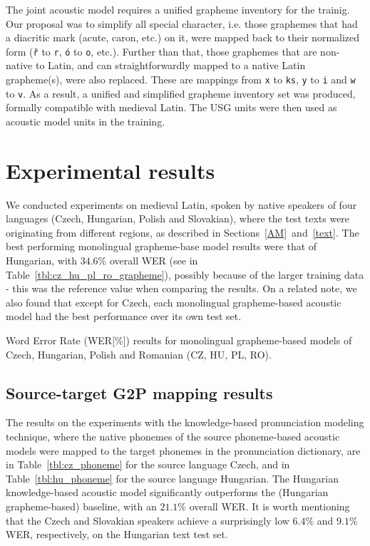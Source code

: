 \documentclass[runningheads,a4paper]{llncs}
\begin{document}
The joint acoustic model requires a unified grapheme inventory for the trainig. Our proposal was to simplify all special character, i.e. those graphemes that had a diacritic mark (acute, caron, etc.) on it, were mapped back to their normalized form (\texttt{\v{r}} to \texttt{r}, \texttt{\'{o}} to \texttt{o}, etc.).
Further than that, those graphemes that are non-native to Latin, and can straightforwardly mapped to a native Latin grapheme(s), were also replaced.
These are mappings from \texttt{x} to \texttt{ks}, \texttt{y} to \texttt{i} and \texttt{w} to \texttt{v}.
As a result, a unified and simplified grapheme inventory set was produced, formally compatible with medieval Latin.
The USG units were then used as acoustic model units in the training.
\section{Experimental results}\label{results}
We conducted experiments on medieval Latin, spoken by native speakers of four languages (Czech, Hungarian, Polish and Slovakian), where the test texts were originating from different regions, as described in Sections~\ref{AM}~and~\ref{text}.
The best performing monolingual grapheme-base model results were that of Hungarian, with $34.6\%$ overall WER (see in Table~\ref{tbl:cz_hu_pl_ro_grapheme}), possibly because of the larger training data - this was the reference value when comparing the results.
On a related note, we also found that except for Czech, each monolingual grapheme-based acoustic model had the best performance over its own test set.

\begin{table}
\centering
\caption{Word Error Rate (WER[\%]) results for monolingual grapheme-based models of Czech, Hungarian, Polish and Romanian (CZ, HU, PL, RO).}
\label{tbl:cz_hu_pl_ro_grapheme}
\end{table}

\subsection{Source-target G2P mapping results}
The results on the experiments with the knowledge-based pronunciation modeling technique, where the native phonemes of the source phoneme-based acoustic models were mapped to the target phonemes in the pronunciation dictionary, are in Table~\ref{tbl:cz_phoneme} for the source language Czech, and in Table~\ref{tbl:hu_phoneme} for the source language Hungarian.
The Hungarian knowledge-based acoustic model significantly outperforms the (Hungarian grapheme-based) baseline, with an $21.1\%$ overall WER.
It is worth mentioning that the Czech and Slovakian speakers achieve a surprisingly low $6.4\%$ and $9.1\%$ WER, respectively, on the Hungarian text test set.
\end{document}
